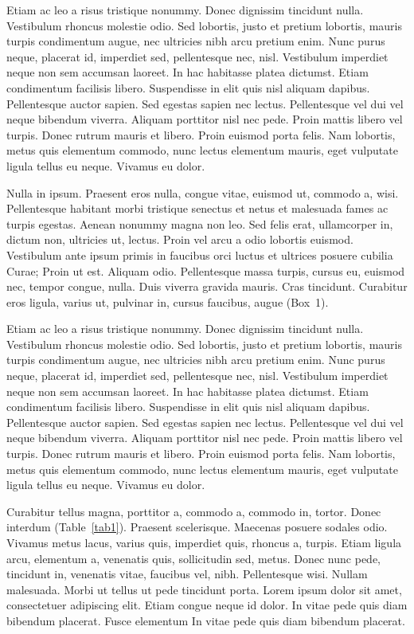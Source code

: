 \documentclass[ASNA,twocolumn]{USG} %
\begin{document}
Etiam ac leo a risus tristique nonummy. Donec dignissim tincidunt nulla. Vestibulum rhoncus molestie odio. Sed
lobortis, justo et pretium lobortis, mauris turpis condimentum augue, nec ultricies nibh arcu pretium enim. Nunc
purus neque, placerat id, imperdiet sed, pellentesque nec, nisl. Vestibulum imperdiet neque non sem accumsan laoreet.
In hac habitasse platea dictumst. Etiam condimentum facilisis libero. Suspendisse in elit quis nisl aliquam dapibus.
Pellentesque auctor sapien. Sed egestas sapien nec lectus. Pellentesque vel dui vel neque bibendum viverra. Aliquam
porttitor nisl nec pede. Proin mattis libero vel turpis. Donec rutrum mauris et libero. Proin euismod porta felis.
Nam lobortis, metus quis elementum commodo, nunc lectus elementum mauris, eget vulputate ligula tellus eu neque.
Vivamus eu dolor.

Nulla in ipsum. Praesent eros nulla, congue vitae, euismod ut, commodo a, wisi. Pellentesque habitant morbi
tristique senectus et netus et malesuada fames ac turpis egestas. Aenean nonummy magna non leo. Sed felis erat,
ullamcorper in, dictum non, ultricies ut, lectus. Proin vel arcu a odio lobortis euismod. Vestibulum ante ipsum primis
in faucibus orci luctus et ultrices posuere cubilia Curae; Proin ut est. Aliquam odio. Pellentesque massa turpis, cursus
eu, euismod nec, tempor congue, nulla. Duis viverra gravida mauris. Cras tincidunt. Curabitur eros ligula, varius ut,
pulvinar in, cursus faucibus, augue (Box~1).


Etiam ac leo a risus tristique nonummy. Donec dignissim tincidunt nulla. Vestibulum rhoncus molestie odio. Sed
lobortis, justo et pretium lobortis, mauris turpis condimentum augue, nec ultricies nibh arcu pretium enim. Nunc
purus neque, placerat id, imperdiet sed, pellentesque nec, nisl. Vestibulum imperdiet neque non sem accumsan laoreet.
In hac habitasse platea dictumst. Etiam condimentum facilisis libero. Suspendisse in elit quis nisl aliquam dapibus.
Pellentesque auctor sapien. Sed egestas sapien nec lectus. Pellentesque vel dui vel neque bibendum viverra. Aliquam
porttitor nisl nec pede. Proin mattis libero vel turpis. Donec rutrum mauris et libero. Proin euismod porta felis.
Nam lobortis, metus quis elementum commodo, nunc lectus elementum mauris, eget vulputate ligula tellus eu neque.
Vivamus eu dolor.



Curabitur tellus magna, porttitor a, commodo a, commodo in, tortor. Donec interdum (Table~\ref{tab1}).  Praesent scelerisque. Maecenas posuere sodales odio. Vivamus metus lacus, varius quis, imperdiet quis, rhoncus a, turpis. Etiam ligula arcu,
elementum a, venenatis quis, sollicitudin sed, metus. Donec nunc pede, tincidunt in, venenatis vitae, faucibus vel,
nibh. Pellentesque wisi. Nullam malesuada. Morbi ut tellus ut pede tincidunt porta. Lorem ipsum dolor sit amet,
consectetuer adipiscing elit. Etiam congue neque id dolor. In vitae pede quis diam bibendum placerat. Fusce elementum In vitae pede quis diam bibendum placerat.
\end{document}
